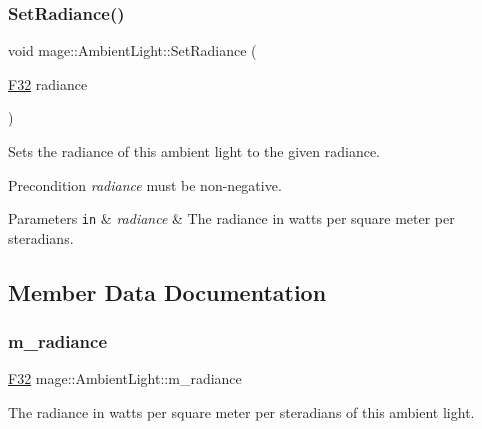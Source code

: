 \subsubsection{\texorpdfstring{Set\+Radiance()}{SetRadiance()}}
{\footnotesize\ttfamily void mage\+::\+Ambient\+Light\+::\+Set\+Radiance (\begin{DoxyParamCaption}\item[{\hyperlink{namespacemage_aa97e833b45f06d60a0a9c4fc22ae02c0}{F32}}]{radiance }\end{DoxyParamCaption})\hspace{0.3cm}{\ttfamily [noexcept]}}

Sets the radiance of this ambient light to the given radiance.

\begin{DoxyPrecond}{Precondition}
{\itshape radiance} must be non-\/negative. 
\end{DoxyPrecond}

\begin{DoxyParams}[1]{Parameters}
\mbox{\tt in}  & {\em radiance} & The radiance in watts per square meter per steradians. \\
\hline
\end{DoxyParams}


\subsection{Member Data Documentation}
\hypertarget{classmage_1_1_ambient_light_a579aff19284637d89d85026b373574aa}{}\label{classmage_1_1_ambient_light_a579aff19284637d89d85026b373574aa} 
\subsubsection{\texorpdfstring{m\+\_\+radiance}{m\_radiance}}
{\footnotesize\ttfamily \hyperlink{namespacemage_aa97e833b45f06d60a0a9c4fc22ae02c0}{F32} mage\+::\+Ambient\+Light\+::m\+\_\+radiance\hspace{0.3cm}{\ttfamily [private]}}

The radiance in watts per square meter per steradians of this ambient light. 
